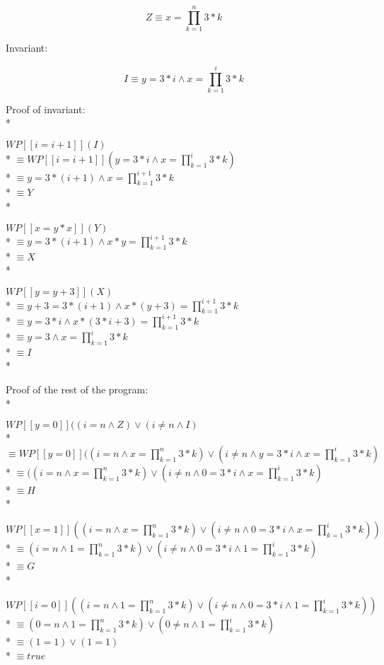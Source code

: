 \documentclass{article}
\begin{document}
$$ Z \equiv x=\prod_{k=1}^{n} 3*k $$

Invariant:

$$ I \equiv y=3*i \land x=\prod_{k=1}^{i} 3*k $$

Proof of invariant: \\*

$ WP[\![i=i+1]\!](I) $ \\*
$ \equiv WP[\![i=i+1]\!](y=3*i \land x=\prod_{k=1}^{i} 3*k) $ \\*
$ \equiv y=3*(i+1) \land x=\prod_{k=1}^{i+1}3*k $ \\*
$ \equiv Y $ \\*

$ WP[\![x=y*x]\!](Y) $ \\*
$ \equiv y=3*(i+1) \land x*y=\prod_{k=1}^{i+1}3*k $ \\*
$ \equiv X $ \\*

$ WP[\![y=y+3]\!](X) $ \\*
$ \equiv y+3=3*(i+1) \land x*(y+3)=\prod_{k=1}^{i+1}3*k $ \\*
$ \equiv y=3*i \land x*(3*i+3)=\prod_{k=1}^{i+1}3*k $ \\*
$ \equiv y=3 \land x=\prod_{k=1}^{i}3*k $ \\*
$ \equiv I $ \\*

Proof of the rest of the program: \\*

$ WP[\![y=0]\!]((i=n \land Z) \lor (i\ne n \land I) $ \\*
$ \equiv WP[\![y=0]\!]((i=n \land x=\prod_{k=1}^{n} 3*k) \lor (i \ne n \land y=3*i \land x=\prod_{k=1}^{i}3*k) $ \\*
$ \equiv ((i=n \land x=\prod_{k=1}^{n} 3*k) \lor (i \ne n \land 0=3*i \land x=\prod_{k=1}^{i}3*k) $ \\*
$ \equiv H $ \\*

$ WP[\![x=1]\!]((i=n \land x=\prod_{k=1}^{n} 3*k) \lor (i \ne n \land 0=3*i \land x=\prod_{k=1}^{i}3*k)) $ \\*
$ \equiv (i=n \land 1=\prod_{k=1}^{n} 3*k) \lor (i \ne n \land 0=3*i \land 1=\prod_{k=1}^{i}3*k) $ \\*
$ \equiv G $ \\*

$ WP[\![i=0]\!]((i=n \land 1=\prod_{k=1}^{n} 3*k) \lor (i \ne n \land 0=3*i \land 1=\prod_{k=1}^{i}3*k)) $ \\*
$ \equiv (0=n \land 1=\prod_{k=1}^{n} 3*k) \lor (0 \ne n \land 1=\prod_{k=1}^{i}3*k) $ \\*
$ \equiv (1=1) \lor (1=1) $ \\*
$ \equiv true $
\end{document}

